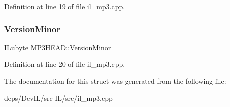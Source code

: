 Definition at line 19 of file il\+\_\+mp3.\+cpp.

\mbox{\label{structMP3HEAD_a223ae88dcaf585a0371671c2e0fb24e1}} 
\subsubsection{\texorpdfstring{Version\+Minor}{VersionMinor}}
{\footnotesize\ttfamily I\+Lubyte M\+P3\+H\+E\+A\+D\+::\+Version\+Minor}



Definition at line 20 of file il\+\_\+mp3.\+cpp.



The documentation for this struct was generated from the following file\+:\begin{DoxyCompactItemize}
\item 
deps/\+Dev\+I\+L/src-\/\+I\+L/src/il\+\_\+mp3.\+cpp\end{DoxyCompactItemize}
